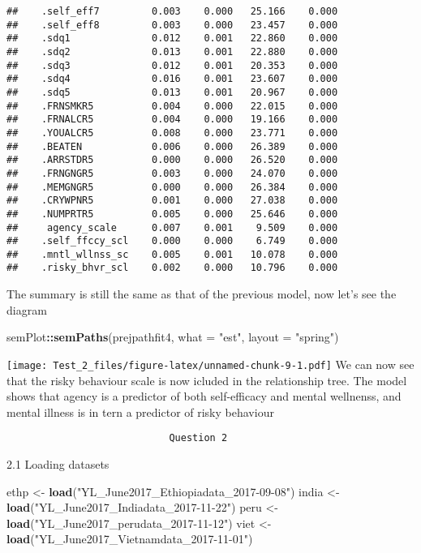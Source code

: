 \documentclass[9pt,]{article}
\newenvironment{Shaded}{\begin{snugshade}}{\end{snugshade}}
\newcommand{\KeywordTok}[1]{\textcolor[rgb]{0.13,0.29,0.53}{\textbf{#1}}}
\newcommand{\DataTypeTok}[1]{\textcolor[rgb]{0.13,0.29,0.53}{#1}}
\newcommand{\StringTok}[1]{\textcolor[rgb]{0.31,0.60,0.02}{#1}}
\newcommand{\OperatorTok}[1]{\textcolor[rgb]{0.81,0.36,0.00}{\textbf{#1}}}
\newcommand{\NormalTok}[1]{#1}
\begin{document}
\begin{verbatim}
##    .self_eff7         0.003    0.000   25.166    0.000
##    .self_eff8         0.003    0.000   23.457    0.000
##    .sdq1              0.012    0.001   22.860    0.000
##    .sdq2              0.013    0.001   22.880    0.000
##    .sdq3              0.012    0.001   20.353    0.000
##    .sdq4              0.016    0.001   23.607    0.000
##    .sdq5              0.013    0.001   20.967    0.000
##    .FRNSMKR5          0.004    0.000   22.015    0.000
##    .FRNALCR5          0.004    0.000   19.166    0.000
##    .YOUALCR5          0.008    0.000   23.771    0.000
##    .BEATEN            0.006    0.000   26.389    0.000
##    .ARRSTDR5          0.000    0.000   26.520    0.000
##    .FRNGNGR5          0.003    0.000   24.070    0.000
##    .MEMGNGR5          0.000    0.000   26.384    0.000
##    .CRYWPNR5          0.001    0.000   27.038    0.000
##    .NUMPRTR5          0.005    0.000   25.646    0.000
##     agency_scale      0.007    0.001    9.509    0.000
##    .self_ffccy_scl    0.000    0.000    6.749    0.000
##    .mntl_wllnss_sc    0.005    0.001   10.078    0.000
##    .risky_bhvr_scl    0.002    0.000   10.796    0.000
\end{verbatim}

The summary is still the same as that of the previous model, now let's
see the diagram

\begin{Shaded}
\begin{Highlighting}[]
\NormalTok{semPlot}\OperatorTok{::}\KeywordTok{semPaths}\NormalTok{(prejpathfit4, }\DataTypeTok{what =} \StringTok{"est"}\NormalTok{, }\DataTypeTok{layout =} \StringTok{"spring"}\NormalTok{)}
\end{Highlighting}
\end{Shaded}

\texttt{[image: Test\_2\_files/figure-latex/unnamed-chunk-9-1.pdf]} We can
now see that the risky behaviour scale is now icluded in the
relationship tree. The model shows that agency is a predictor of both
self-efficacy and mental wellnenss, and mental illness is in tern a
predictor of risky behaviour

\begin{verbatim}
                            Question 2
\end{verbatim}

2.1 Loading datasets

\begin{Shaded}
\begin{Highlighting}[]
\NormalTok{ethp  <-}\StringTok{ }\KeywordTok{load}\NormalTok{(}\StringTok{"YL_June2017_Ethiopiadata_2017-09-08"}\NormalTok{)}
\NormalTok{india <-}\StringTok{ }\KeywordTok{load}\NormalTok{(}\StringTok{"YL_June2017_Indiadata_2017-11-22"}\NormalTok{)}
\NormalTok{peru  <-}\StringTok{ }\KeywordTok{load}\NormalTok{(}\StringTok{"YL_June2017_perudata_2017-11-12"}\NormalTok{)}
\NormalTok{viet  <-}\StringTok{ }\KeywordTok{load}\NormalTok{(}\StringTok{"YL_June2017_Vietnamdata_2017-11-01"}\NormalTok{)}
\end{Highlighting}
\end{Shaded}
\end{document}

